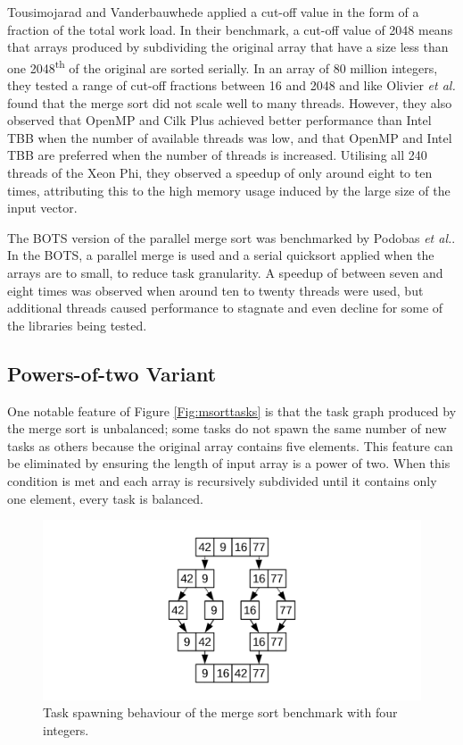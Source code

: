 \documentclass{report}
\begin{document}
Tousimojarad and Vanderbauwhede\cite{Tousimojarad14} applied a cut-off value in the form of a fraction of the total work load. In their benchmark, a cut-off value of 2048 means that arrays produced by subdividing the original array that have a size less than one 2048\textsuperscript{th} of the original are sorted serially. In an array of 80 million integers, they tested a range of cut-off fractions between 16 and 2048 and like Olivier \textit{et al.} found that the merge sort did not scale well to many threads. However, they also observed that OpenMP and Cilk Plus achieved better performance than Intel TBB when the number of available threads was low, and that OpenMP and Intel TBB are preferred when the number of threads is increased. Utilising all 240 threads of the Xeon Phi, they observed a speedup of only around eight to ten times, attributing this to the high memory usage induced by the large size of the input vector.

The BOTS\cite{Duran09} version of the parallel merge sort was benchmarked by Podobas \textit{et al.}\cite{Podobas15}. In the BOTS, a parallel merge is used and a serial quicksort applied when the arrays are to small, to reduce task granularity. A speedup of between seven and eight times was observed when around ten to twenty threads were used, but additional threads caused performance to stagnate and even decline for some of the libraries being tested.

\subsection{Powers-of-two Variant} \label{Sec:powersoftwovariant}
One notable feature of Figure \ref{Fig:msorttasks} is that the task graph produced by the merge sort is unbalanced; some tasks do not spawn the same number of new tasks as others because the original array contains five elements. This feature can be eliminated by ensuring the length of input array is a power of two. When this condition is met and each array is recursively subdivided until it contains only one element, every task is balanced.
\noindent
\begin{figure}
	\includegraphics[width=\linewidth]{../diagrams/msort_powers_tasks}
	\caption{Task spawning behaviour of the merge sort benchmark with four integers.}
	\label{Fig:msortpowerstasks}
\end{figure}
\end{document}
